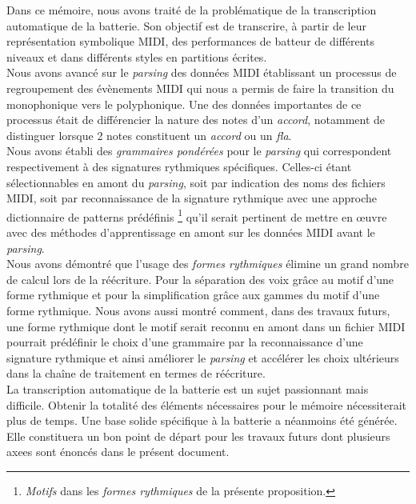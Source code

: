 Dans ce mémoire, nous avons traité de la problématique de la transcription
automatique de la batterie. Son objectif est de transcrire, à partir de leur
représentation symbolique MIDI, des performances de batteur de différents
niveaux et dans différents styles en partitions écrites.\\

Nous avons avancé sur le \textit{parsing} des données MIDI établissant un processus de
regroupement des évènements MIDI qui nous a permis de faire la transition du
monophonique vers le polyphonique. Une des données importantes de ce processus
était de différencier la nature des notes d’un \textit{accord}, notamment de
distinguer lorsque 2 notes constituent un \textit{accord} ou un \textit{fla}.\\
Nous avons établi des \textit{grammaires pondérées} pour le \textit{parsing} qui
correspondent respectivement à des signatures rythmiques spécifiques. Celles-ci
étant sélectionnables en amont du \textit{parsing}, soit par indication des noms des
fichiers MIDI, soit par reconnaissance de la signature rythmique avec une approche dictionnaire de
patterns prédéfinis \footnote{\textit{Motifs} dans les \textit{formes rythmiques} de la
présente proposition.} qu’il serait pertinent de mettre en œuvre avec des
méthodes d’apprentissage en amont sur les données MIDI avant le \textit{parsing}.\\
Nous avons démontré que l’usage des \textit{formes rythmiques} élimine un grand nombre
de calcul lors de la réécriture. Pour la séparation des voix grâce au motif
d’une forme rythmique et pour la simplification grâce aux gammes du motif d’une forme rythmique.
Nous avons aussi montré comment, dans des travaux futurs, une forme rythmique dont le
motif serait reconnu en amont dans un fichier MIDI pourrait prédéfinir le choix
d’une grammaire par la reconnaissance d’une signature rythmique et ainsi améliorer le
\textit{parsing} et accélérer les choix ultérieurs dans la chaîne de traitement en termes
de réécriture.\\

La transcription automatique de la batterie est un sujet passionnant mais
difficile. Obtenir la totalité des éléments nécessaires pour le mémoire
nécessiterait plus de temps. Une base solide spécifique à la batterie a
néanmoins été générée. Elle constituera un bon point de départ pour les travaux futurs
dont plusieurs axees sont énoncés dans le présent document.
